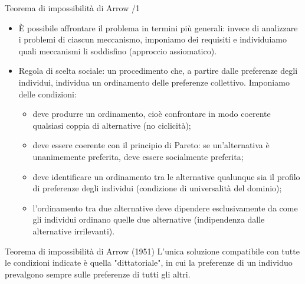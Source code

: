 \documentclass[aspectratio=64,12pt]{beamer}
\begin{document}
\begin{frame}{Teorema di impossibilità di Arrow /1}
\begin{resize}{.9}
\begin{itemize}
\item È possibile affrontare il problema in termini più generali: invece di
analizzare i problemi di ciascun meccanismo, imponiamo dei requisiti e
individuiamo quali meccanismi li soddisfino (\alert{approccio assiomatico}).
\item \alert{Regola di scelta sociale}: un procedimento che, a partire dalle preferenze
  degli individui, individua un ordinamento delle preferenze collettivo.
  Imponiamo delle condizioni:
\begin{itemize}
\item deve produrre un ordinamento, cioè confrontare in modo coerente qualsiasi
coppia di alternative (no ciclicità);
\item deve essere coerente con il \alert{principio di Pareto}: se un'alternativa è
unanimemente preferita, deve essere socialmente preferita;
\item deve identificare un ordinamento tra le alternative qualunque sia il
profilo di preferenze degli individui (condizione di \alert{universalità} del
dominio);
\item l'ordinamento tra due alternative deve dipendere esclusivamente da come
gli individui ordinano quelle due alternative 
(\alert{indipendenza dalle alternative irrilevanti}).
\end{itemize}
\end{itemize}
\begin{block}{Teorema di impossibilità di Arrow (1951)}
L'unica soluzione compatibile con tutte le condizioni indicate è quella
"dittatoriale", in cui la preferenze di un individuo prevalgono sempre sulle
preferenze di tutti gli altri.
\end{block}
\end{resize}
\end{frame}
\end{document}
